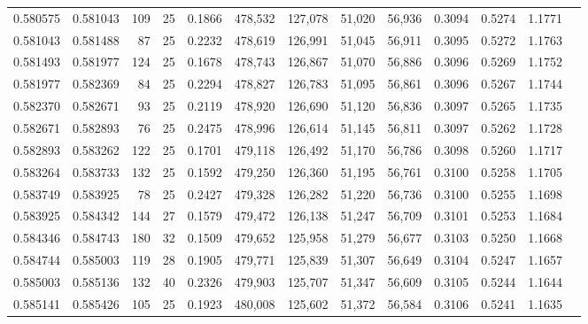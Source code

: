 \begin{tabular}{rrrrrrrrrrrrr}
0.580575 & 0.581043 &   109 &  25 &                                     0.1866 & 478,532 & 127,078 &  51,020 &  56,936 & 0.3094 & 0.5274 & 1.1771 \\
0.581043 & 0.581488 &    87 &  25 &                                     0.2232 & 478,619 & 126,991 &  51,045 &  56,911 & 0.3095 & 0.5272 & 1.1763 \\
0.581493 & 0.581977 &   124 &  25 &                                     0.1678 & 478,743 & 126,867 &  51,070 &  56,886 & 0.3096 & 0.5269 & 1.1752 \\
0.581977 & 0.582369 &    84 &  25 &                                     0.2294 & 478,827 & 126,783 &  51,095 &  56,861 & 0.3096 & 0.5267 & 1.1744 \\
0.582370 & 0.582671 &    93 &  25 &                                     0.2119 & 478,920 & 126,690 &  51,120 &  56,836 & 0.3097 & 0.5265 & 1.1735 \\
0.582671 & 0.582893 &    76 &  25 &                                     0.2475 & 478,996 & 126,614 &  51,145 &  56,811 & 0.3097 & 0.5262 & 1.1728 \\
0.582893 & 0.583262 &   122 &  25 &                                     0.1701 & 479,118 & 126,492 &  51,170 &  56,786 & 0.3098 & 0.5260 & 1.1717 \\
0.583264 & 0.583733 &   132 &  25 &                                     0.1592 & 479,250 & 126,360 &  51,195 &  56,761 & 0.3100 & 0.5258 & 1.1705 \\
0.583749 & 0.583925 &    78 &  25 &                                     0.2427 & 479,328 & 126,282 &  51,220 &  56,736 & 0.3100 & 0.5255 & 1.1698 \\
0.583925 & 0.584342 &   144 &  27 &                                     0.1579 & 479,472 & 126,138 &  51,247 &  56,709 & 0.3101 & 0.5253 & 1.1684 \\
0.584346 & 0.584743 &   180 &  32 &                                     0.1509 & 479,652 & 125,958 &  51,279 &  56,677 & 0.3103 & 0.5250 & 1.1668 \\
0.584744 & 0.585003 &   119 &  28 &                                     0.1905 & 479,771 & 125,839 &  51,307 &  56,649 & 0.3104 & 0.5247 & 1.1657 \\
0.585003 & 0.585136 &   132 &  40 &                                     0.2326 & 479,903 & 125,707 &  51,347 &  56,609 & 0.3105 & 0.5244 & 1.1644 \\
0.585141 & 0.585426 &   105 &  25 &                                     0.1923 & 480,008 & 125,602 &  51,372 &  56,584 & 0.3106 & 0.5241 & 1.1635 \\

\end{tabular}
